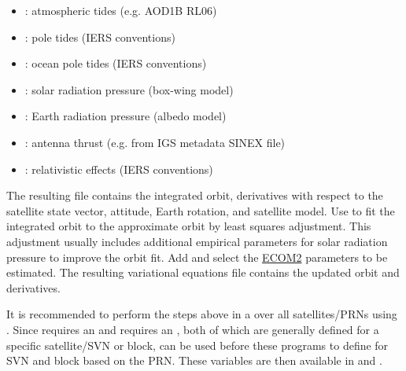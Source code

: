 \begin{itemize}
  \item {}: atmospheric tides (e.g. AOD1B RL06)
  \item {}: pole tides (IERS conventions)
  \item {}: ocean pole tides (IERS conventions)
  \item {}:
        solar radiation pressure (box-wing model)
  \item {}: Earth radiation pressure (albedo model)
  \item {}:
        antenna thrust (e.g. from IGS metadata SINEX file)
  \item {}:
        relativistic effects (IERS conventions)
\end{itemize}

The resulting  file contains the integrated orbit, derivatives
with respect to the satellite state vector, attitude, Earth rotation, and satellite model.
Use  to fit the integrated orbit to the approximate orbit by
least squares adjustment. This adjustment usually includes additional empirical parameters for solar radiation
pressure to improve the orbit fit.
Add 
and select the \href{https://doi.org/10.1007/s00190-015-0814-4}{ECOM2} parameters to be estimated.
The resulting variational equations file contains the updated orbit and derivatives.

It is recommended to perform the steps above in a  over all
satellites/PRNs using . Since  requires an
 and  requires an
, both of which are generally defined for a specific satellite/SVN
or block,  can be used before these programs to define
 for SVN and block based on the PRN.
These variables are then available in  and
.

